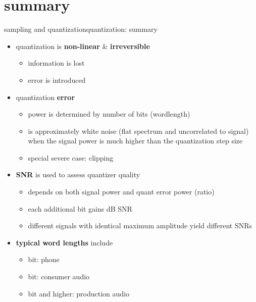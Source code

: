 	\section{summary}	
		\begin{frame}{sampling and quantization}{quantization: summary }
			\vspace{-3mm}
            \begin{itemize}
                \item   quantization is  \textbf{non-linear} \& \textbf{irreversible}
                    \begin{itemize}
                        \item   information is lost
                        \item   error is introduced
                    \end{itemize}
                \smallskip
                \item<2->   quantization \textbf{error}
                    \begin{itemize}
                        \item   power is determined by number of bits (wordlength)
                        \item   is approximately white noise (flat spectrum and uncorrelated to signal) when the signal power is much higher than the quantization step size
                        \item   special severe case: clipping
                    \end{itemize}
                \smallskip
                \item<3->   \textbf{SNR} is used to assess quantizer quality
                    \begin{itemize}
                        \item   depends on both signal power and quant error power (ratio)
                        \item   each additional bit gains \unit[6]{dB} SNR
                        \item   different signals with identical maximum amplitude yield different SNRs
                    \end{itemize}
                \smallskip
                \item<4-> \textbf{typical word lengths} include
                    \begin{itemize}
                        \item   \unit[8]{bit}: phone
                        \item   \unit[16]{bit}: consumer audio
                        \item   \unit[24]{bit} and higher: production audio
                    \end{itemize}
			\end{itemize}
		\end{frame}
 



